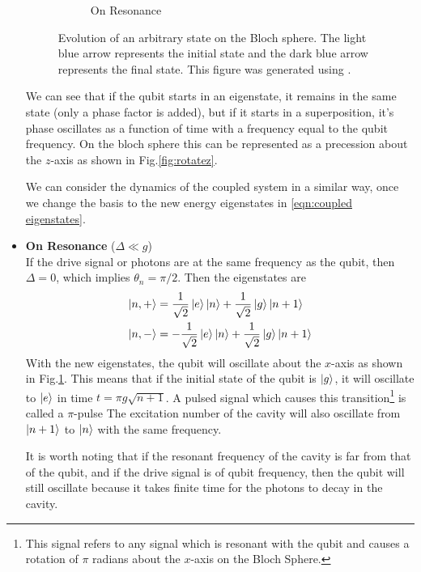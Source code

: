 \begin{itemize}
\begin{figure}
\begin{subfigure}[b]{0.45\textwidth}
\caption{On Resonance}
\label{fig:rotatex}
\end{subfigure}
\decoRule
\caption[Qubit Evolution on Bloch Sphere]{Evolution of an arbitrary state on the Bloch sphere. The light blue arrow represents the initial state and the dark blue arrow represents the final state. This figure was generated using \cite{Johansson2012}.}
\label{fig:rotatexz}
\end{figure}

We can see that if the qubit starts in an eigenstate, it remains in the same state (only a phase factor is added), but if it starts in a superposition, it's phase oscillates as a function of time with a frequency equal to the qubit frequency. On the bloch sphere this can be represented as a precession about the $z$-axis as shown in Fig.\ref{fig:rotatez}.

We can consider the dynamics of the coupled system in a similar way, once we change the basis to the new energy eigenstates in \ref{eqn:coupled eigenstates}.

\item \textbf{On Resonance} ($\Delta\ll g$)\\
If the drive signal or photons are at the same frequency as the qubit, then $\Delta=0$, which implies $\theta_n=\pi/2$. Then the eigenstates are
\begin{subequations}
\label{eqn:delta zero eigenstates}
\begin{align}
\ket{n,+} &= \frac{1}{\sqrt{2}}\ket{e}\ket{n}+\frac{1}{\sqrt{2}}\ket{g}\ket{n+1}\\
\ket{n,-} &= -\frac{1}{\sqrt{2}}\ket{e}\ket{n}+\frac{1}{\sqrt{2}}\ket{g}\ket{n+1}
\end{align}
\end{subequations}
With the new eigenstates, the qubit will oscillate about the $x$-axis as shown in Fig.\ref{fig:rotatex}. This means that if the initial state of the qubit is $\ket{g}$, it will oscillate to $\ket{e}$ in time $t=\pi g\sqrt{n+1}$. A pulsed signal which causes this transition\footnote{This signal refers to any signal which is resonant with the qubit and causes a rotation of $\pi$ radians about the $x$-axis on the Bloch Sphere.} is called a $\pi$-pulse The excitation number of the cavity will also oscillate from $\ket{n+1}$ to $\ket{n}$ with the same frequency.

It is worth noting that if the resonant frequency of the cavity is far from that of the qubit, and if the drive signal is of qubit frequency, then the qubit will still oscillate because it takes finite time for the photons to decay in the cavity.


\end{itemize}

